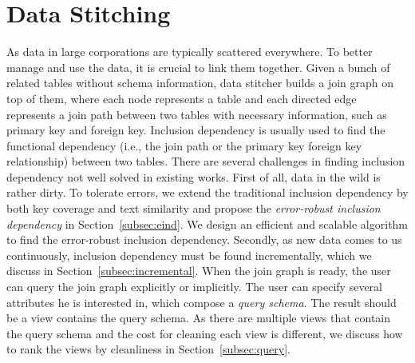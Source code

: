 

\newcommand{\eind}{error-robust inclusion dependency\xspace}
\newcommand{\ind}{inclusion dependency\xspace}
\newcommand{\R}{\ensuremath{R}\xspace}
\renewcommand{\S}{\ensuremath{S}\xspace}
\newcommand{\X}{\ensuremath{X}\xspace}
\newcommand{\Y}{\ensuremath{Y}\xspace}
\newcommand{\RX}{\ensuremath{\R[\X]}\xspace}
\newcommand{\SY}{\ensuremath{\S[\Y]}\xspace}
\newcommand{\IND}{IND\ensuremath{(\X,\Y)}\xspace}
\newcommand{\EIND}{EIND\ensuremath{(\X,\Y)}\xspace}
\newcommand\subsetsim{\mathrel{%
  \ooalign{\raise0.3ex\hbox{$\subset$}\cr\hidewidth\raise-0.6ex\hbox{\scalebox{0.8}{$\sim$}}\hidewidth\cr}}}
\newcommand{\G}{\ensuremath{G}\xspace}
\newcommand{\E}{\ensuremath{E}\xspace}
\newcommand{\U}{\ensuremath{U}\xspace}
\newcommand{\V}{\ensuremath{V}\xspace}

\newtheorem{theorem}{Theorem}
\newtheorem{example}{Example}
\newtheorem{definition}{Definition}
\newtheorem{proposition}{Proposition}
\newtheorem{lemma}{Lemma}
\newtheorem{corollary}{Corollary}



\section{Data Stitching}\label{sec:stitching}




As data in large corporations are typically scattered everywhere. To better manage and use the data, it is crucial to link them together. Given a bunch of related tables without schema information, data stitcher builds a join graph on top of them, where each node represents a table and each directed edge represents a join path between two tables with necessary information, such as primary key and foreign key. Inclusion dependency is usually used to find the functional dependency (i.e., the join path or the primary key foreign key relationship) between two tables. There are several challenges in finding inclusion dependency not well solved in existing works. First of all, data in the wild is rather dirty. To tolerate errors, we extend the traditional inclusion dependency by both key coverage and text similarity and propose the \emph{\eind} in Section~\ref{subsec:eind}. We design an efficient and scalable algorithm to find the \eind. Secondly, as new data comes to us continuously, inclusion dependency must be found incrementally, which we discuss in Section~\ref{subsec:incremental}. When the join graph is ready, the user can query the join graph explicitly or implicitly. The user can specify several attributes he is interested in, which compose a \emph{query schema}. The result should be a view contains the query schema. As there are multiple views that contain the query schema and the cost for cleaning each view is different, we discuss how to rank the views by cleanliness in Section~\ref{subsec:query}.


